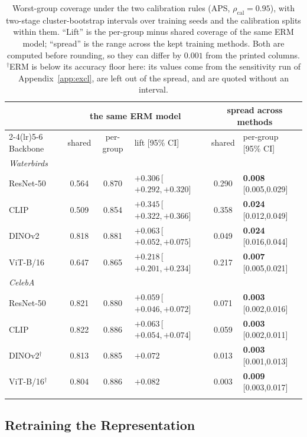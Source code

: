 \documentclass[pdflatex,sn-basic]{sn-jnl}%
\theoremstyle{thmstyleone}%
\newcommand{\rhocal}{\rho_{\mathrm{cal}}}
\begin{document}
\begin{table}[t]
\centering
\caption{Worst-group coverage under the two calibration rules (APS, $\rhocal=0.95$), with two-stage cluster-bootstrap intervals over training seeds and the calibration splits within them. ``Lift'' is the per-group minus shared coverage of the same ERM model; ``spread'' is the range across the kept training methods. Both are computed before rounding, so they can differ by $0.001$ from the printed columns. $^{\dagger}$ERM is below its accuracy floor here: its values come from the sensitivity run of Appendix~\ref{app:excl}, are left out of the spread, and are quoted without an interval.}
\label{tab:c1}
\footnotesize
\setlength{\tabcolsep}{3.5pt}
\begin{tabular}{lcclcl}
\toprule
 & \multicolumn{3}{c}{the same ERM model} & \multicolumn{2}{c}{spread across methods} \\
\cmidrule(lr){2-4}\cmidrule(lr){5-6}
Backbone & shared & per-group & lift [95\% CI] & shared & per-group [95\% CI] \\
\midrule
\multicolumn{6}{l}{\emph{Waterbirds}} \\
ResNet-50 & 0.564 & 0.870 & $+0.306$\,[$+0.292,+0.320$] & 0.290 & \textbf{0.008}\,[0.005,0.029] \\
CLIP & 0.509 & 0.854 & $+0.345$\,[$+0.322,+0.366$] & 0.358 & \textbf{0.024}\,[0.012,0.049] \\
DINOv2 & 0.818 & 0.881 & $+0.063$\,[$+0.052,+0.075$] & 0.049 & \textbf{0.024}\,[0.016,0.044] \\
ViT-B/16 & 0.647 & 0.865 & $+0.218$\,[$+0.201,+0.234$] & 0.217 & \textbf{0.007}\,[0.005,0.021] \\
\midrule
\multicolumn{6}{l}{\emph{CelebA}} \\
ResNet-50 & 0.821 & 0.880 & $+0.059$\,[$+0.046,+0.072$] & 0.071 & \textbf{0.003}\,[0.002,0.016] \\
CLIP & 0.822 & 0.886 & $+0.063$\,[$+0.054,+0.074$] & 0.059 & \textbf{0.003}\,[0.002,0.011] \\
DINOv2$^{\dagger}$ & 0.813 & 0.885 & $+0.072$ & 0.013 & \textbf{0.003}\,[0.001,0.013] \\
ViT-B/16$^{\dagger}$ & 0.804 & 0.886 & $+0.082$ & 0.003 & \textbf{0.009}\,[0.003,0.017] \\
\botrule
\end{tabular}
\end{table}

\subsection{Retraining the Representation}
\label{sec:repr}
\end{document}
